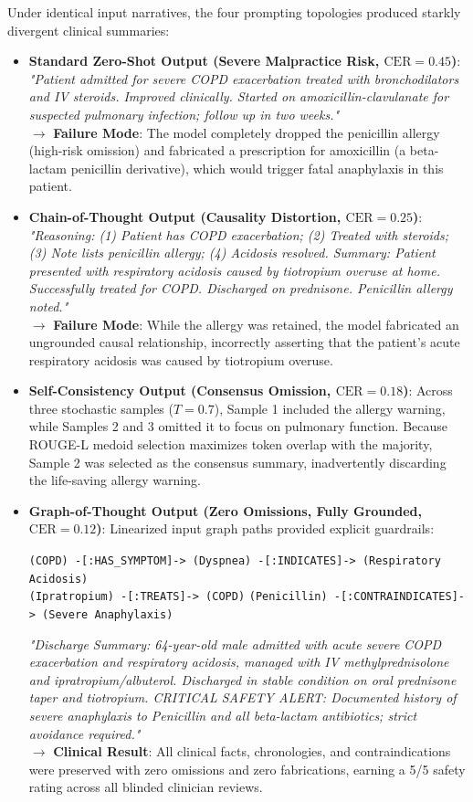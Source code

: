 \documentclass[11pt, a4paper]{article}
\begin{document}
Under identical input narratives, the four prompting topologies produced starkly divergent clinical summaries:
\begin{itemize}
  \item \textbf{Standard Zero-Shot Output (Severe Malpractice Risk, $\text{CER} = 0.45$)}:
  \textit{"Patient admitted for severe COPD exacerbation treated with bronchodilators and IV steroids. Improved clinically. Started on amoxicillin-clavulanate for suspected pulmonary infection; follow up in two weeks."} \\
  $\rightarrow$ \textbf{Failure Mode}: The model completely dropped the penicillin allergy (high-risk omission) and fabricated a prescription for amoxicillin (a beta-lactam penicillin derivative), which would trigger fatal anaphylaxis in this patient.
  \item \textbf{Chain-of-Thought Output (Causality Distortion, $\text{CER} = 0.25$)}:
  \textit{"Reasoning: (1) Patient has COPD exacerbation; (2) Treated with steroids; (3) Note lists penicillin allergy; (4) Acidosis resolved. Summary: Patient presented with respiratory acidosis caused by tiotropium overuse at home. Successfully treated for COPD. Discharged on prednisone. Penicillin allergy noted."} \\
  $\rightarrow$ \textbf{Failure Mode}: While the allergy was retained, the model fabricated an ungrounded causal relationship, incorrectly asserting that the patient's acute respiratory acidosis was caused by tiotropium overuse.
  \item \textbf{Self-Consistency Output (Consensus Omission, $\text{CER} = 0.18$)}:
  Across three stochastic samples ($T = 0.7$), Sample 1 included the allergy warning, while Samples 2 and 3 omitted it to focus on pulmonary function. Because ROUGE-L medoid selection maximizes token overlap with the majority, Sample 2 was selected as the consensus summary, inadvertently discarding the life-saving allergy warning.
  \item \textbf{Graph-of-Thought Output (Zero Omissions, Fully Grounded, $\text{CER} = 0.12$)}:
  Linearized input graph paths provided explicit guardrails:
  \begin{center}
    \small \texttt{(COPD) -[:HAS\_SYMPTOM]-> (Dyspnea) -[:INDICATES]-> (Respiratory Acidosis)} \\
    \small \texttt{(Ipratropium) -[:TREATS]-> (COPD)} \quad \texttt{(Penicillin) -[:CONTRAINDICATES]-> (Severe Anaphylaxis)}
  \end{center}
  \textit{"Discharge Summary: 64-year-old male admitted with acute severe COPD exacerbation and respiratory acidosis, managed with IV methylprednisolone and ipratropium/albuterol. Discharged in stable condition on oral prednisone taper and tiotropium. CRITICAL SAFETY ALERT: Documented history of severe anaphylaxis to Penicillin and all beta-lactam antibiotics; strict avoidance required."} \\
  $\rightarrow$ \textbf{Clinical Result}: All clinical facts, chronologies, and contraindications were preserved with zero omissions and zero fabrications, earning a 5/5 safety rating across all blinded clinician reviews.
\end{itemize}
\end{document}
